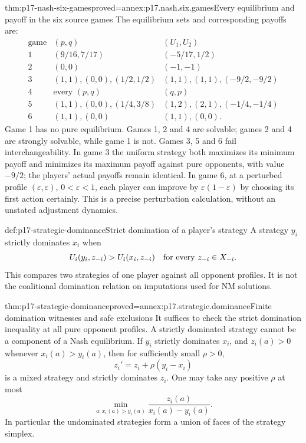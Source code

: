 \begin{hbtheorem}{thm:p17-nash-six-games}{proved=annex:p17.nash.six.games}{Every equilibrium and payoff in the six source games}
The equilibrium sets and corresponding payoffs are:
\[
\begin{array}{c|c|c}
\text{game}&(p,q)&(U_1,U_2)\\ \hline
1&(9/16,7/17)&(-5/17,1/2)\\
2&(0,0)&(-1,-1)\\
3&(1,1),(0,0),(1/2,1/2)&(1,1),(1,1),(-9/2,-9/2)\\
4&\text{every }(p,q)&(q,p)\\
5&(1,1),(0,0),(1/4,3/8)&(1,2),(2,1),(-1/4,-1/4)\\
6&(1,1),(0,0)&(1,1),(0,0).
\end{array}
\]
Game 1 has no pure equilibrium. Games 1, 2 and 4 are solvable;
games 2 and 4 are strongly solvable, while game 1 is not.
Games 3, 5 and 6 fail interchangeability.
In game 3 the uniform strategy both maximizes its minimum
payoff and minimizes its maximum payoff against pure opponents,
with value \(-9/2\); the players' actual payoffs remain identical.
In game 6, at a perturbed profile
\((\varepsilon,\varepsilon)\), \(0<\varepsilon<1\), each player
can improve by \(\varepsilon(1-\varepsilon)\) by choosing its
first action certainly. This is a precise perturbation calculation,
without an unstated adjustment dynamics.
\end{hbtheorem}

\begin{hbdefinition}{def:p17-strategic-dominance}{Strict domination of a player's strategy}
A strategy \(y_i\) strictly dominates \(x_i\) when
\[
               U_i(y_i,z_{-i})>U_i(x_i,z_{-i})
                          \quad\hbox{for every }z_{-i}\in X_{-i}.
\]
This compares two strategies of one player against all opponent
profiles. It is not the coalitional domination relation on
imputations used for NM solutions.
\end{hbdefinition}

\begin{hblemma}{thm:p17-strategic-dominance}{proved=annex:p17.strategic.dominance}{Finite domination witnesses and safe exclusions}
It suffices to check the strict domination inequality at all
pure opponent profiles. A strictly dominated strategy cannot
be a component of a Nash equilibrium.
If \(y_i\) strictly dominates \(x_i\), and \(z_i(a)>0\)
whenever \(x_i(a)>y_i(a)\), then for sufficiently small
\(\rho>0\),
\[
                       z_i'=z_i+\rho(y_i-x_i)
\]
is a mixed strategy and strictly dominates \(z_i\).
One may take any positive \(\rho\) at most
\[
       \min_{a:x_i(a)>y_i(a)}
                      \frac{z_i(a)}{x_i(a)-y_i(a)}.
\]
In particular the undominated strategies form a union of faces
of the strategy simplex.
\end{hblemma}

